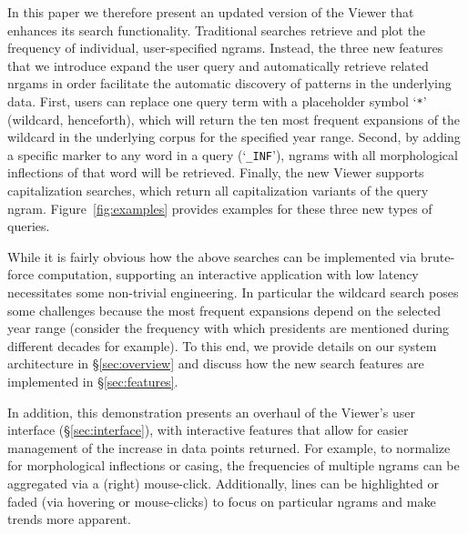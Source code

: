 \documentclass[11pt,a4paper]{article}
\newcommand{\query}[1]{\texttt{#1}}
\begin{document}
In this paper we therefore present an updated version of the Viewer that enhances its search functionality. Traditional searches retrieve and plot the frequency of individual, user-specified ngrams. Instead, the three new features that we introduce expand the user query and automatically retrieve related nrgams in order facilitate the automatic discovery of patterns in the underlying data. First, users can replace one query term with a placeholder symbol `\query{*}' (wildcard, henceforth), which will return the ten most frequent expansions of the wildcard in the underlying corpus for the specified year range. 
Second, by adding a specific marker to any word in a query (`\query{\_INF}'), ngrams with all morphological inflections of that word will be retrieved. 
Finally, the new Viewer supports capitalization searches, which return all capitalization variants of the query ngram. Figure~\ref{fig:examples} provides examples for these three new types of queries.

While it is fairly obvious how the above searches can be implemented via brute-force computation, supporting an interactive application with low latency necessitates some non-trivial engineering. In particular the wildcard search poses some challenges because the most frequent expansions depend on the selected year range (consider the frequency with which presidents are mentioned during different decades for example). To this end, we provide details on our system architecture in \S\ref{sec:overview}  and discuss how the new search features are implemented in \S\ref{sec:features}.

In addition, this demonstration presents an overhaul of the Viewer's user interface (\S\ref{sec:interface}), with interactive features that allow for easier management of the increase in data points returned. For example, to normalize for morphological inflections or casing, the frequencies of multiple ngrams can be aggregated via a (right) mouse-click. Additionally, lines can be highlighted or faded (via hovering or mouse-clicks) to focus on particular ngrams and make trends more apparent.
\end{document}
